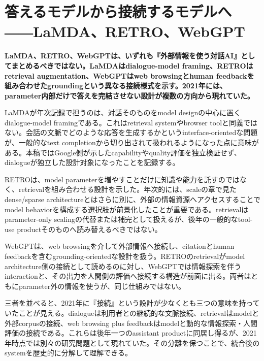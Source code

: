 \section{答えるモデルから接続するモデルへ――LaMDA、RETRO、WebGPT}
\noindent\textbf{LaMDA、RETRO、WebGPTは、いずれも『外部情報を使う対話AI』としてまとめるべきではない。LaMDAはdialogue-model framing、RETROはretrieval augmentation、WebGPTはweb browsingとhuman feedbackを組み合わせたgroundingという異なる接続様式を示す。2021年には、parameter内部だけで答えを完結させない設計が複数の方向から現れていた。}\autocite{src-66643bb115ae,src-6ab2302937b2,src-72eada5e8850,src-a3971b3f646f,src-bb1464aabad9}

LaMDAが年次記録で担うのは、対話そのものをmodel designの中心に置くdialogue-model framingである。これはretrieval systemやbrowser toolと同義ではない。会話の文脈でどのような応答を生成するかというinterface-orientedな問題が、一般的なtext completionから切り出されて扱われるようになった点に意味がある。本稿ではGoogle側が示したcapabilityやquality評価を独立検証せず、dialogueが独立した設計対象になったことを記録する。\autocite{src-a3971b3f646f}


RETROは、model parameterを増やすことだけに知識や能力を託すのではなく、retrievalを組み合わせる設計を示した。年次的には、scaleの章で見たdense/sparse architectureとはさらに別に、外部の情報資源へアクセスすることでmodel behaviorを構成する選択肢が前景化したことが重要である。retrievalはparameter-only scalingの代替または補完として扱えるが、後年の一般的なtool-use productそのものへ読み替えるべきではない。\autocite{src-66643bb115ae,src-6ab2302937b2}


WebGPTは、web browsingを介して外部情報へ接続し、citationとhuman feedbackを含むgrounding-orientedな設計を扱う。RETROのretrievalがmodel architecture側の接続として読めるのに対し、WebGPTでは情報探索を伴うinteractionと、その出力を人間側の評価へ接続する構造が前面に出る。両者はともにparameter外の情報を使うが、同じ仕組みではない。\autocite{src-72eada5e8850,src-bb1464aabad9}


三者を並べると、2021年に『接続』という設計が少なくとも三つの意味を持っていたことが見える。dialogueは利用者との継続的な文脈接続、retrievalはmodelと外部corpusの接続、web browsing plus feedbackはmodelと動的な情報探索・人間評価の接続である。これらは後年一つのassistant productに同居し得るが、2021年時点では別々の研究問題として現れていた。その分離を保つことで、統合後のsystemを歴史的に分解して理解できる。\autocite{src-66643bb115ae,src-6ab2302937b2,src-72eada5e8850,src-a3971b3f646f,src-bb1464aabad9}


